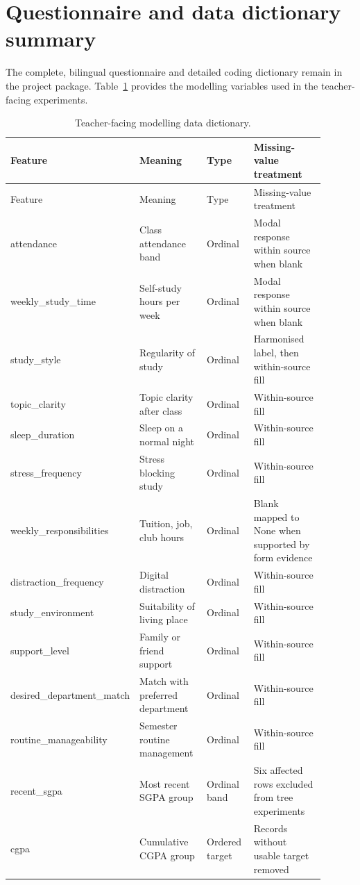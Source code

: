 \documentclass[11pt,a4paper]{article}
\begin{document}
\section{Questionnaire and data dictionary summary}
The complete, bilingual questionnaire and detailed coding dictionary remain in the project package. Table~\ref{tab:dictionary} provides the modelling variables used in the teacher-facing experiments.
\begin{longtable}{p{0.24\linewidth}p{0.23\linewidth}p{0.16\linewidth}p{0.27\linewidth}}
\caption{Teacher-facing modelling data dictionary.}\label{tab:dictionary}\\
\toprule Feature & Meaning & Type & Missing-value treatment\\\midrule\endfirsthead
\toprule Feature & Meaning & Type & Missing-value treatment\\\midrule\endhead
attendance & Class attendance band & Ordinal & Modal response within source when blank\\
weekly\_study\_time & Self-study hours per week & Ordinal & Modal response within source when blank\\
study\_style & Regularity of study & Ordinal & Harmonised label, then within-source fill\\
topic\_clarity & Topic clarity after class & Ordinal & Within-source fill\\
sleep\_duration & Sleep on a normal night & Ordinal & Within-source fill\\
stress\_frequency & Stress blocking study & Ordinal & Within-source fill\\
weekly\_responsibilities & Tuition, job, club hours & Ordinal & Blank mapped to None when supported by form evidence\\
distraction\_frequency & Digital distraction & Ordinal & Within-source fill\\
study\_environment & Suitability of living place & Ordinal & Within-source fill\\
support\_level & Family or friend support & Ordinal & Within-source fill\\
desired\_department\_match & Match with preferred department & Ordinal & Within-source fill\\
routine\_manageability & Semester routine management & Ordinal & Within-source fill\\
recent\_sgpa & Most recent SGPA group & Ordinal band & Six affected rows excluded from tree experiments\\
cgpa & Cumulative CGPA group & Ordered target & Records without usable target removed\\
\bottomrule
\end{longtable}
\end{document}
